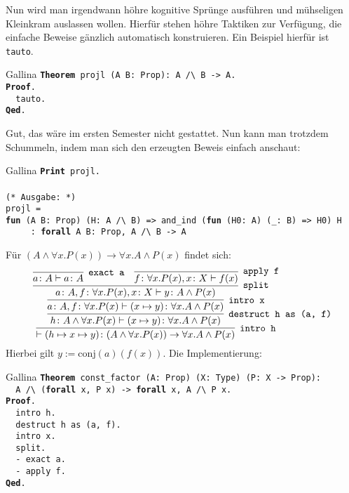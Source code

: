 \documentclass[8pt]{beamer}
\newcommand{\kw}[1]{\textbf{#1}}
\begin{document}
\begin{frame}
Nun wird man irgendwann höhre kognitive Sprünge ausführen und
mühseligen Kleinkram auslassen wollen. Hierfür stehen höhre Taktiken
zur Verfügung, die einfache Beweise gänzlich automatisch konstruieren.
Ein Beispiel hierfür ist \texttt{tauto}.\pause
\begin{block}{Gallina}
\texttt{\kw{Theorem} projl (A B: Prop): A /{\textbackslash} B -> A.\\
\kw{Proof}.\\
\ \ tauto.\\
\kw{Qed}.}
\end{block}\pause
Gut, das wäre im ersten Semester nicht gestattet. Nun kann man trotzdem
Schummeln, indem man sich den erzeugten Beweis einfach anschaut:
\begin{block}{Gallina}
\texttt{\kw{Print} projl.\\
\mbox{}\\
(* Ausgabe: *)\\
projl = \\
\kw{fun} (A B: Prop) (H: A /{\textbackslash} B) => and\_ind (\kw{fun} (H0: A) (\_: B) => H0) H\\
\ \ \ \ \ : \kw{forall} A B: Prop, A /{\textbackslash} B -> A}
\end{block}
\end{frame}

\begin{frame}
Für $(A\land\forall x. P(x))\to\forall x. A\land P(x)$ findet sich:\pause
\[
\infer[\texttt{intro h}]{\vdash (h\mapsto x\mapsto y)\colon (A\land\forall x. P(x))\to\forall x. A\land P(x)}{
  \infer[\texttt{destruct h as (a, f)}]{h\colon A\land\forall x. P(x)\vdash (x\mapsto y)\colon\forall x.A\land P(x)}{
    \infer[\texttt{intro x}]{a\colon A, f\colon \forall x.P(x)\vdash (x\mapsto y)\colon\forall x.A\land P(x)}{
      \infer[\texttt{split}]{a\colon A, f\colon \forall x.P(x), x\colon X\vdash y\colon A\land P(x)}{
        \infer[\texttt{exact a}]{a\colon A\vdash a\colon A}{}
      & \infer[\texttt{apply f}]{f\colon\forall x.P(x), x\colon X\vdash f(x)}{}}}}}
\]
Hierbei gilt $y:=\mathrm{conj}(a)(f(x))$. Die Implementierung:\pause

\begin{block}{Gallina}
\texttt{\kw{Theorem} const\_factor (A: Prop) (X: Type) (P: X -> Prop):\\
\ \ A /{\textbackslash} (\kw{forall} x, P x) -> \kw{forall} x, A /{\textbackslash} P x.\\
\kw{Proof}.\\
\ \ intro h.\\
\ \ destruct h as (a, f).\\
\ \ intro x.\\
\ \ split.\\
\ \ - exact a.\\
\ \ - apply f.\\
\kw{Qed}.}
\end{block}
\end{frame}
\end{document}
